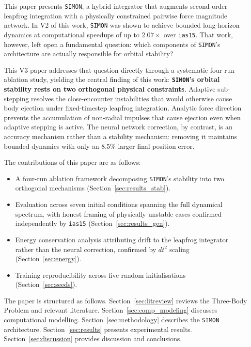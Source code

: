 \documentclass[12pt,a4paper]{article}
\newcommand{\simon}{\texttt{SIMON}}
\newcommand{\ias}{\texttt{ias15}}
\begin{document}
This paper presents \simon{}, a hybrid integrator that augments second-order leapfrog integration with a physically constrained pairwise force magnitude network. In V2 of this work, \simon{} was shown to achieve bounded long-horizon dynamics at computational speedups of up to $2.07\times$ over \ias{}. That work, however, left open a fundamental question: which components of \simon{}'s architecture are actually responsible for orbital stability?

This V3 paper addresses that question directly through a systematic four-run ablation study, yielding the central finding of this work: \textbf{\simon{}'s orbital stability rests on two orthogonal physical constraints}. Adaptive sub-stepping resolves the close-encounter instabilities that would otherwise cause body ejection under fixed-timestep leapfrog integration. Analytic force direction prevents the accumulation of non-radial impulses that cause ejection even when adaptive stepping is active. The neural network correction, by contrast, is an accuracy mechanism rather than a stability mechanism: removing it maintains bounded dynamics with only an 8.5\% larger final position error.

The contributions of this paper are as follows:
\begin{itemize}
    \item A four-run ablation framework decomposing \simon{}'s stability into two orthogonal mechanisms (Section~\ref{sec:results_stab}).
    \item Evaluation across seven initial conditions spanning the full dynamical spectrum, with honest framing of physically unstable cases confirmed independently by \ias{} (Section~\ref{sec:results_gen}).
    \item Energy conservation analysis attributing drift to the leapfrog integrator rather than the neural correction, confirmed by $dt^2$ scaling (Section~\ref{sec:energy}).
    \item Training reproducibility across five random initialisations (Section~\ref{sec:seeds}).
\end{itemize}

The paper is structured as follows. Section~\ref{sec:litreview} reviews the Three-Body Problem and relevant literature. Section~\ref{sec:comp_modeling} discusses computational modelling. Section~\ref{sec:methodology} describes the \simon{} architecture. Section~\ref{sec:results} presents experimental results. Section~\ref{sec:discussion} provides discussion and conclusions.
\end{document}
